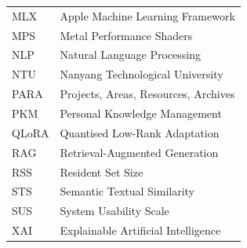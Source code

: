 \begin{longtable}{@{}l l@{}}
  MLX    & Apple Machine Learning Framework \\
  MPS    & Metal Performance Shaders \\
  NLP    & Natural Language Processing \\
  NTU    & Nanyang Technological University \\
  PARA   & Projects, Areas, Resources, Archives \\
  PKM    & Personal Knowledge Management \\
  QLoRA  & Quantised Low-Rank Adaptation \\
  RAG    & Retrieval-Augmented Generation \\
  RSS    & Resident Set Size \\
  STS    & Semantic Textual Similarity \\
  SUS    & System Usability Scale \\
  XAI    & Explainable Artificial Intelligence \\
\end{longtable}
